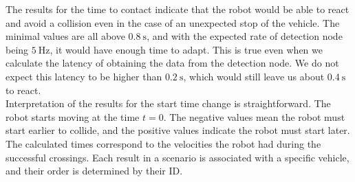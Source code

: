         The results for the time to contact indicate that the robot would be able to react and avoid a collision even in the case of an unexpected stop of the vehicle. The minimal values are all above $0.8\:\si{\s}$, and with the expected rate of detection node being $5\:\si{\Hz}$, it would have enough time to adapt. This is true even when we calculate the latency of obtaining the data from the detection node. We do not expect this latency to be higher than $0.2\:\si{\s}$, which would still leave us about $0.4\:\si{\s}$ to react.\\
        Interpretation of the results for the start time change is straightforward. The robot starts moving at the time $t=0$. The negative values mean the robot must start earlier to collide, and the positive values indicate the robot must start later. The calculated times correspond to the velocities the robot had during the successful crossings. Each result in a scenario is associated with a specific vehicle, and their order is determined by their ID.

